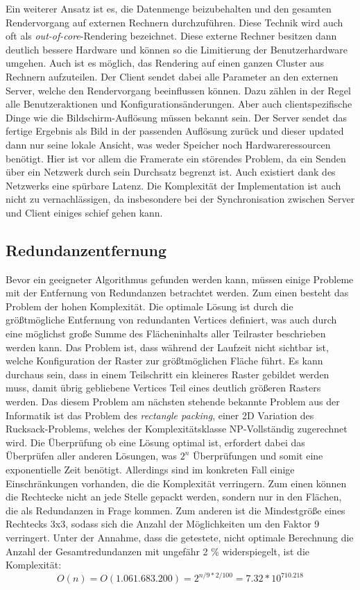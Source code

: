 Ein weiterer Ansatz ist es, die Datenmenge beizubehalten und den gesamten Rendervorgang auf externen Rechnern durchzuführen. Diese Technik wird auch oft als \textit{out-of-core}-Rendering bezeichnet\cite[Abschnitt 3]{outOfCore}. Diese externe Rechner besitzen dann deutlich bessere Hardware und können so die Limitierung der Benutzerhardware umgehen. Auch ist es möglich, das Rendering auf einen ganzen Cluster aus Rechnern aufzuteilen.  Der Client sendet dabei alle Parameter an den externen Server, welche den Rendervorgang beeinflussen können. Dazu zählen in der Regel alle Benutzeraktionen und Konfigurationsänderungen. Aber auch clientspezifische Dinge wie die Bildschirm-Auflösung müssen bekannt sein. Der Server sendet das fertige Ergebnis als Bild in der passenden Auflösung zurück und dieser updated dann nur seine lokale Ansicht, was weder Speicher noch Hardwareressourcen benötigt. Hier ist vor allem die Framerate ein störendes Problem, da ein Senden über ein Netzwerk durch sein Durchsatz begrenzt ist. Auch existiert dank des Netzwerks eine spürbare Latenz. Die Komplexität der Implementation ist auch nicht zu vernachlässigen, da insbesondere bei der Synchronisation zwischen Server und Client einiges schief gehen kann.

\subsection{Redundanzentfernung}\label{redundanzberechnung}
Bevor ein geeigneter Algorithmus gefunden werden kann, müssen einige Probleme mit der Entfernung von Redundanzen betrachtet werden. Zum einen besteht das Problem der hohen Komplexität. Die optimale Lösung ist durch die größtmögliche Entfernung von redundanten Vertices definiert, was auch durch eine möglichst große Summe des Flächeninhalts aller Teilraster beschrieben werden kann. Das Problem ist, dass während der Laufzeit nicht sichtbar ist, welche Konfiguration der Raster zur größtmöglichen Fläche führt. Es kann durchaus sein, dass in einem Teilschritt ein kleineres Raster gebildet werden muss, damit übrig gebliebene Vertices Teil eines deutlich größeren Rasters werden. Das diesem Problem am nächsten stehende bekannte Problem aus der Informatik ist das Problem des \textit{rectangle packing}, einer 2D Variation des Rucksack-Problems, welches der Komplexitätsklasse NP-Vollständig zugerechnet wird. Die Überprüfung ob eine Lösung optimal ist, erfordert dabei das Überprüfen aller anderen Lösungen, was $2^n$ Überprüfungen und somit eine exponentielle Zeit benötigt. Allerdings sind im konkreten Fall einige Einschränkungen vorhanden, die die Komplexität verringern. Zum einen können die Rechtecke nicht an jede Stelle gepackt werden, sondern nur in den Flächen, die als Redundanzen in Frage kommen. Zum anderen ist die Mindestgröße eines Rechtecks 3x3, sodass sich die Anzahl der Möglichkeiten um den Faktor 9 verringert. Unter der Annahme, dass die getestete, nicht optimale Berechnung die Anzahl der Gesamtredundanzen mit ungefähr 2 \% widerspiegelt, ist die Komplexität: \[O(n) = O(1.061.683.200) = 2^{n / 9 * 2 / 100} = 7.32 * 10^{710.218}\]

